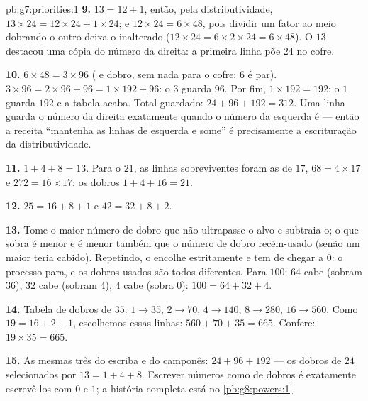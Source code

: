 \begin{solution}{pb:g7:priorities:1}
\textbf{9.} $13 = 12 + 1$, então, pela distributividade,
$13 \times 24 = 12 \times 24 + 1 \times 24$; e
$12 \times 24 = 6 \times 48$, pois dividir um fator ao meio dobrando o
outro deixa o  inalterado
($12 \times 24 = 6 \times 2 \times 24 = 6 \times 48$). O 
$13$ destacou uma cópia do número da direita: a primeira linha põe $24$
no cofre.

\textbf{10.} $6 \times 48 = 3 \times 96$ ( e dobro, sem nada para
o cofre: $6$ é par). $3 \times 96 = 2 \times 96 + 96 =
1 \times 192 + 96$: o  $3$ guarda $96$. Por fim,
$1 \times 192 = 192$: o  $1$ guarda $192$ e a tabela acaba. Total
guardado: $24 + 96 + 192 = 312$. Uma linha guarda o número da direita
exatamente quando o número da esquerda é  --- então a receita
``mantenha as linhas de esquerda  e some'' é precisamente a
escrituração da distributividade.

\textbf{11.} $1 + 4 + 8 = 13$. Para o $21$, as linhas sobreviventes
foram as de $17$, $68 = 4 \times 17$ e $272 = 16 \times 17$: os dobros
$1 + 4 + 16 = 21$.

\textbf{12.} $25 = 16 + 8 + 1$ e $42 = 32 + 8 + 2$.

\textbf{13.} Tome o maior número de dobro que não ultrapasse o alvo e
subtraia-o; o que sobra é menor e é menor também que o número de dobro
recém-usado (senão um maior teria cabido). Repetindo, o  encolhe
estritamente e tem de chegar a $0$: o processo para, e os dobros usados
são todos diferentes. Para $100$: $64$ cabe (sobram $36$), $32$ cabe
(sobram $4$), $4$ cabe (sobra $0$): $100 = 64 + 32 + 4$.

\textbf{14.} Tabela de dobros de $35$: $1 \to 35$, $2 \to 70$,
$4 \to 140$, $8 \to 280$, $16 \to 560$. Como $19 = 16 + 2 + 1$,
escolhemos essas linhas: $560 + 70 + 35 = 665$. Confere:
$19 \times 35 = 665$.

\textbf{15.} As mesmas três do escriba e do camponês:
$24 + 96 + 192$ --- os dobros de $24$ selecionados por
$13 = 1 + 4 + 8$. Escrever números como  de dobros é exatamente
escrevê-los com $0$ e $1$; a história completa está no
\cref{pb:g8:powers:1}.
\end{solution}
